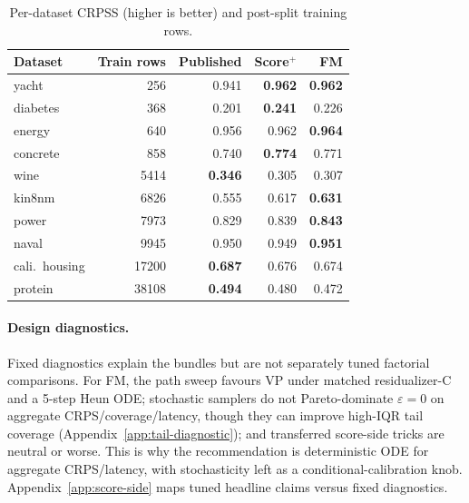 \documentclass{tpm2026}
\begin{document}
\begin{table}[!t]
  \centering
  \caption{Per-dataset CRPSS (higher is better) and post-split training rows.}\label{tab:per-dataset}
  \footnotesize
  \begin{tabular}{lrrrr}
    \toprule
    Dataset & Train rows & Published & Score$^+$ & FM \\
    \midrule
    yacht & 256 & 0.941 & \textbf{0.962} & \textbf{0.962} \\
    diabetes & 368 & 0.201 & \textbf{0.241} & 0.226 \\
    energy & 640 & 0.956 & 0.962 & \textbf{0.964} \\
    concrete & 858 & 0.740 & \textbf{0.774} & 0.771 \\
    wine & 5414 & \textbf{0.346} & 0.305 & 0.307 \\
    kin8nm & 6826 & 0.555 & 0.617 & \textbf{0.631} \\
    power & 7973 & 0.829 & 0.839 & \textbf{0.843} \\
    naval & 9945 & 0.950 & 0.949 & \textbf{0.951} \\
    cali.\ housing & 17200 & \textbf{0.687} & 0.676 & 0.674 \\
    protein & 38108 & \textbf{0.494} & 0.480 & 0.472 \\
    \bottomrule
  \end{tabular}
\end{table}

\paragraph{Design diagnostics.} Fixed diagnostics explain the bundles but are not separately tuned factorial comparisons. For FM, the path sweep favours VP under matched residualizer-C and a 5-step Heun ODE; stochastic samplers do not Pareto-dominate $\varepsilon=0$ on aggregate CRPS/coverage/latency, though they can improve high-IQR tail coverage (Appendix~\ref{app:tail-diagnostic}); and transferred score-side tricks are neutral or worse. This is why the recommendation is deterministic ODE for aggregate CRPS/latency, with stochasticity left as a conditional-calibration knob. Appendix~\ref{app:score-side} maps tuned headline claims versus fixed diagnostics.
\end{document}
